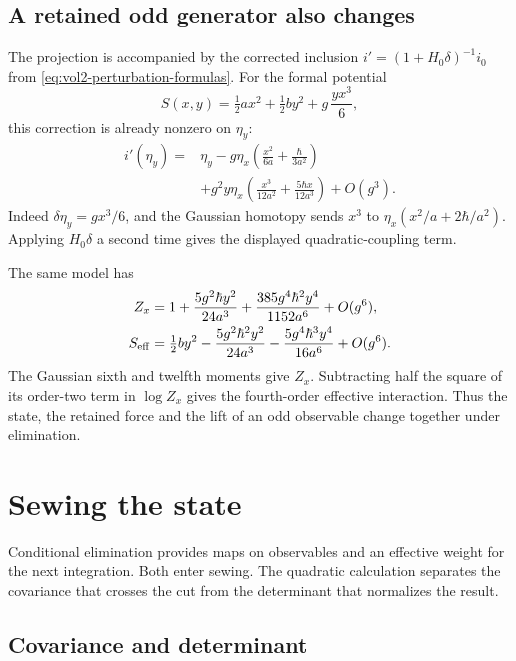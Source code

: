 \subsection{A retained odd generator also changes}

The projection is accompanied by the corrected inclusion
$i'=(1+H_0\delta)^{-1}i_0$ from
\eqref{eq:vol2-perturbation-formulas}. For the formal potential
\[
 S(x,y)=\tfrac12ax^2+\tfrac12by^2+g\,\frac{yx^3}{6},
\]
this correction is already nonzero on $\eta_y$:
\begin{equation}\label{eq:vol2-cubic-antifield-lift}
 \begin{split}
 i'(\eta_y)={}&\eta_y
  -g\eta_x\left(\frac{x^2}{6a}+\frac{\hbar}{3a^2}\right)\\
 &+g^2y\eta_x\left(\frac{x^3}{12a^2}
                          +\frac{5\hbar x}{12a^3}\right)+O(g^3).
 \end{split}
\end{equation}
Indeed $\delta\eta_y=gx^3/6$, and the Gaussian homotopy
sends $x^3$ to $\eta_x(x^2/a+2\hbar/a^2)$.
Applying $H_0\delta$ a second time gives the displayed
quadratic-coupling term.

The same model has
\begin{align}
 Z_x&=1+\frac{5g^2\hbar y^2}{24a^3}
             +\frac{385g^4\hbar^2y^4}{1152a^6}+O(g^6),
             \label{eq:vol2-cubic-partition}\\
 S_{\mathrm{eff}}
 &=\tfrac12by^2-\frac{5g^2\hbar^2y^2}{24a^3}
                       -\frac{5g^4\hbar^3y^4}{16a^6}+O(g^6).
                       \notag
\end{align}
The Gaussian sixth and twelfth moments give $Z_x$.
Subtracting half the square of its order-two term in
$\log Z_x$ gives the fourth-order effective interaction.
Thus the state, the retained force and the lift of an odd
observable change together under elimination.

\section{Sewing the state}
\label{sec:vol2-state-sewing}

Conditional elimination provides maps on observables and an
effective weight for the next integration. Both enter sewing.
The quadratic calculation separates the covariance that crosses
the cut from the determinant that normalizes the result.

\subsection{Covariance and determinant}

